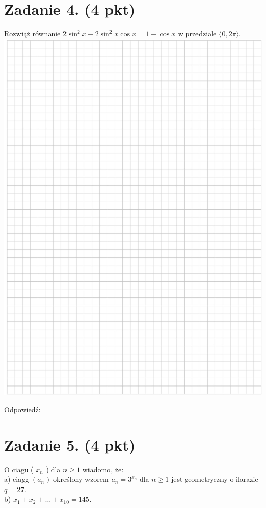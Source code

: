 \documentclass[10pt]{article}
\begin{document}
\section*{Zadanie 4. (4 pkt)}
Rozwiąż równanie \(2 \sin ^{2} x-2 \sin ^{2} x \cos x=1-\cos x\) w przedziale \(\langle 0,2 \pi\rangle\).\\
\includegraphics[max width=\textwidth, center]{2024_11_21_b36d8cbb94edb763da2cg-06}

Odpowiedź:

\section*{Zadanie 5. (4 pkt)}
O ciagu ( \(x_{n}\) ) dla \(n \geq 1\) wiadomo, że:\\
a) ciagg \(\left(a_{n}\right)\) określony wzorem \(a_{n}=3^{x_{n}}\) dla \(n \geq 1\) jest geometryczny o ilorazie \(q=27\).\\
b) \(x_{1}+x_{2}+\ldots+x_{10}=145\).
\end{document}
